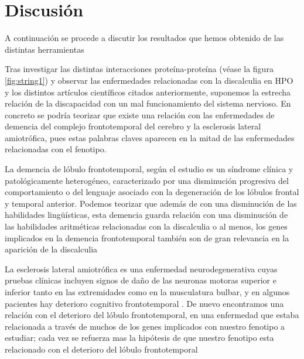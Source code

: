 \newpage

\section{Discusión}

\hfill

A continuación se procede a discutir los resultados que hemos obtenido de las distintas herramientas

\hfill

Tras investigar las distintas interacciones proteína-proteína (véase la figura \ref{fig:string1}) y observar las enfermedades relacionadas con la discalculia en HPO y los distintos artículos científicos citados anteriormente, suponemos la estrecha relación de la discapacidad con un mal funcionamiento del sistema nervioso. En concreto se podría teorizar que existe una relación con las enfermedades de demencia del complejo frontotemporal del cerebro y la esclerosis lateral amiotrófica, pues estas palabras claves aparecen en la mitad de las enfermedades relacionadas con el fenotipo.

\hfill

La demencia de lóbulo frontotemporal, según el estudio \cite{FrontotemoralDementia} es un síndrome clínica y patológicamente heterogéneo, caracterizado por una disminución progresiva del comportamiento o del lenguaje asociado con la degeneración de los lóbulos frontal y temporal anterior. Podemos teorizar que además de con una disminución de las habilidades lingüísticas, esta demencia guarda relación con una disminución de las habilidades aritméticas relacionadas con la discalculia o al menos, los genes implicados en la demencia frontotemporal también son de gran relevancia en la aparición de la discalculia

\hfill

La esclerosis lateral amiotrófica es una enfermedad neurodegenerativa cuyas  pruebas clínicas incluyen signos de daño de las neuronas motoras superior e inferior tanto en las extremidades como en la musculatura bulbar, y en algunos pacientes hay deterioro cognitivo frontotemporal \cite{EsclerosisLateraAmiotrófica}. De nuevo encontramos una relación con el deterioro del lóbulo frontotemporal, en una enfermedad que estaba relacionada a través de muchos de los genes implicados con nuestro fenotipo a estudiar; cada vez se refuerza mas la hipótesis de que nuestro fenotipo esta relacionado con el deterioro del lóbulo frontotemporal

\hfill


